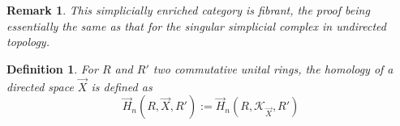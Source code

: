 \documentclass[a4paper,fleqn]{cas-sc}
\newtheorem{rem}{Remark}%
\newtheorem{dfnt}{Definition}%
\newcommand{\G}{\Vec{H}}
\newcommand{\K}{\mathcal{K}}
\begin{document}




\begin{rem}
This simplicially enriched category is fibrant, the proof being essentially the same as that for the singular simplicial complex in undirected topology.
\end{rem}

\begin{dfnt}
For $R$ and $R'$ two commutative unital rings, the homology of a directed space $\Vec{X}$ is defined as 
\[\G_n (R, \Vec{X}, R')  := \G_n (R, \K_{\Vec{X}}, R')\]
\end{dfnt}


\end{document}
